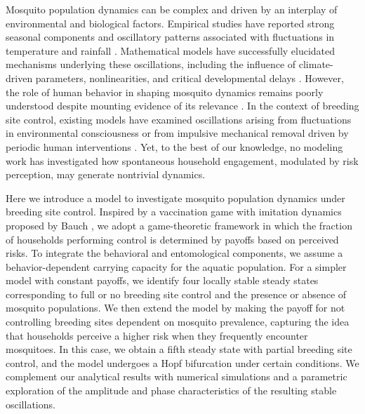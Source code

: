 \documentclass{article}
\theoremstyle{remark}
\theoremstyle{custom} %
\begin{document}
Mosquito population dynamics can be complex and driven by an interplay of environmental and biological factors. Empirical studies have reported strong seasonal components and oscillatory patterns associated with fluctuations in temperature and rainfall \cite{whittaker2022novel,lana2018assessment,shaman2007reproductive}. Mathematical models have successfully elucidated mechanisms underlying these oscillations, including the influence of climate-driven parameters, nonlinearities, and critical developmental delays \cite{abdelrazec2017mathematical,okuneye2018mathematical, wan2014new,juan2025two}. However, the role of human behavior in shaping mosquito dynamics remains poorly understood despite mounting evidence of its relevance \cite{renard2023interaction,thongsripong2021human}. In the context of breeding site control, existing models have examined oscillations arising from fluctuations in environmental consciousness \cite{predescu2006analysis,predescu2007dynamics} or from impulsive mechanical removal driven by periodic human interventions \cite{dumont_mosquito_control}. Yet, to the best of our knowledge, no modeling work has investigated how spontaneous household engagement, modulated by risk perception, may generate nontrivial dynamics.



Here we introduce a model to investigate mosquito population dynamics under breeding site control. Inspired by a vaccination game with imitation dynamics proposed by Bauch \cite{bauch2005imitation}, we adopt a game-theoretic framework in which the fraction of households performing control is determined by payoffs based on perceived risks.  To integrate the behavioral and entomological components, we assume a behavior-dependent carrying capacity for the aquatic population. For a simpler model with constant payoffs, we identify four locally stable steady states corresponding to full or no breeding site control and the presence or absence of mosquito populations. We then extend the model by making the payoff for not controlling breeding sites dependent on mosquito prevalence, capturing the idea that households perceive a higher risk when they frequently encounter mosquitoes. In this case, we obtain a fifth steady state with partial breeding site control, and the model undergoes a Hopf bifurcation under certain conditions. We complement our analytical results with numerical simulations and a parametric exploration of the amplitude and phase characteristics of the resulting stable oscillations.
\end{document}
